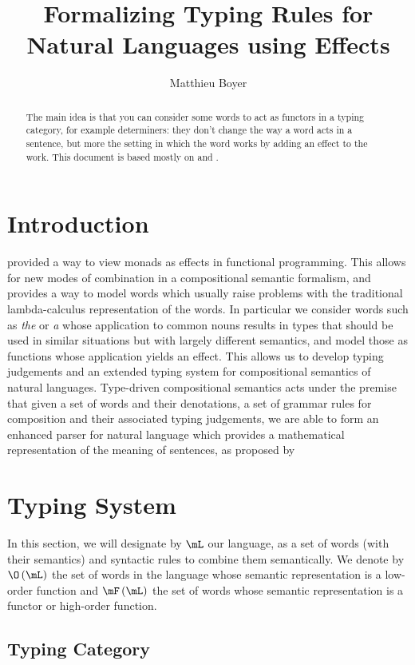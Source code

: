 \documentclass[math, english, info]{cours}
\title{Formalizing Typing Rules for Natural Languages using Effects}
\author{Matthieu Boyer}
\begin{document}
\bettertitle

\begin{abstract}
The main idea is that you can consider some words to act as functors in a typing category, for example determiners:
they don't change the way a word acts in a sentence,
but more the setting in which the word works by adding an effect to the work.
This document is based mostly on  and .
\end{abstract}

\section*{Introduction}
 provided a way to view monads as effects in functional programming.
This allows for new modes of combination in a compositional semantic formalism, and provides a way to model words which usually raise problems with the traditional lambda-calculus representation of the words.
In particular we consider words such as \textsl{the} or \textsl{a} whose application to common nouns results in types that should be used in similar situations but with largely different semantics, and model those as functions whose application yields an effect.
This allows us to develop typing judgements and an extended typing system for compositional semantics of natural languages.
Type-driven compositional semantics acts under the premise that given a set of words and their denotations, a set of grammar rules for composition and their associated typing judgements, we are able to form an enhanced parser for natural language which provides a mathematical representation of the meaning of sentences, as proposed by 

\section{Typing System}
\label{sec:typingsystem}
In this section, we will designate by $\mL$ our language, as a set of words (with their semantics) and syntactic rules to combine them semantically.
We denote by $\O\left( \mL \right)$ the set of words in the language whose semantic representation is a low-order function and $\mF\left( \mL \right)$ the set of words whose semantic representation is a functor or high-order function.

\subsection{Typing Category}\label{subsec:typingcategory}
\end{document}
